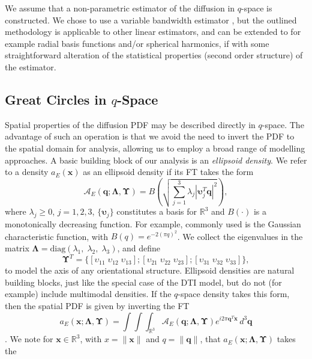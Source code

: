 \documentclass[dvips,aoas,preprint]{imsart}
\numberwithin{equation}{section}
\theoremstyle{plain}
\newcommand{\q}{\mathbf{q}}
\newcommand{\bu}{\bs{\upsilon}}
\newcommand{\x}{\mathbf{x}}
\newcommand{\cA}{\mathcal{A}}
\newcommand{\bs}[1]{\boldsymbol{#1}}
\begin{document}
We assume that a non-parametric estimator of the diffusion in
$q$-space is constructed. We chose to use a variable bandwidth
estimator \citep{OlhedeWhitcher,OlhedeWhitcherISBI}, but the outlined
methodology is applicable to other linear estimators, and can be
extended to for example radial basis functions and/or spherical
harmonics, if with some straightforward alteration of the statistical
properties (second order structure) of the estimator.

\subsection{Great Circles in $q$-Space}

Spatial properties of the diffusion PDF may be described directly in
$q$-space.  The advantage of such an operation is that we avoid the
need to invert the PDF to the spatial domain for analysis, allowing us
to employ a broad range of modelling approaches.  A basic building
block of our analysis is an {\em ellipsoid density}.  We refer to a
density $a_E(\x)$ as an ellipsoid density if its FT takes the form
\begin{equation}\label{ellipsoid}
  \cA_E\left(\q; \bm{\Lambda},\bm{\Upsilon}\right) =
  B\left(\sqrt{\sum_{j=1}^3\lambda_j\left|\bu_j^T\q\right|^2
  }\right),
\end{equation}
where $\lambda_j\ge{0}$, $j=1,2,3$, $\{\bu_j\}$ constitutes a basis
for ${\mathbb{R}}^3$ and $B(\cdot)$ is a monotonically decreasing
function.  For example, commonly used is the Gaussian characteristic function, with
$B(q)=e^{-2(\pi q)^2}$.  We collect the eigenvalues in the matrix
$\bs{\Lambda}={\text{diag}}\left(\lambda_1,\;\lambda_2,\;\lambda_3\right)$,
and define
\[\bm{\Upsilon}^T=\{[\upsilon_{11}\;\upsilon_{12}\;\upsilon_{13}];
[\upsilon_{21}\;\upsilon_{22}\;\upsilon_{23}];
[\upsilon_{31}\;\upsilon_{32}\;\upsilon_{33}]\},\] to model the axis of any orientational structure.  Ellipsoid densities
are natural building blocks, just like the special case of the DTI
model, but do not (for example) include multimodal densities.  If the $q$-space
density takes this form, then the spatial PDF is given by inverting
the FT
\begin{equation}
  a_E(\x;\bm{\Lambda},\bm{\Upsilon}) = \int\int\int_{\mathbb{R}^3}
  \cA_E(\q; \bm{\Lambda},\bm{\Upsilon})e^{i2\pi \q^T\x} \, d^3 \q
\end{equation}
\citep{Callaghan}.  We note for $\x\in\mathbb{R}^3$, with $x=\|\x\|$
and $q=\|\q\|$, that $a_E(\x;\bm{\Lambda},\bm{\Upsilon})$ takes the
\end{document}
